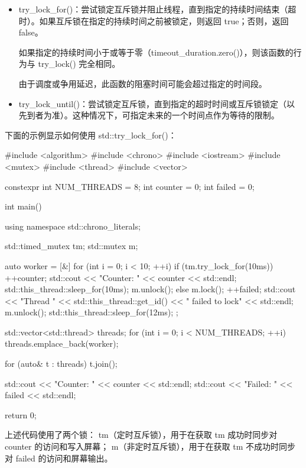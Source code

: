 \begin{itemize}
\item
try\_lock\_for()：尝试锁定互斥锁并阻止线程，直到指定的持续时间结束（超时）。如果互斥锁在指定的持续时间之前被锁定，则返回 true；否则，返回 false。

如果指定的持续时间小于或等于零（timeout\_duration.zero()），则该函数的行为与 try\_lock() 完全相同。

由于调度或争用延迟，此函数的阻塞时间可能会超过指定的时间段。

\item
try\_lock\_until()：尝试锁定互斥锁，直到指定的超时时间或互斥锁锁定（以先到者为准）。这种情况下，可指定未来的一个时间点作为等待的限制。
\end{itemize}

下面的示例显示如何使用 std::try\_lock\_for()：

\begin{cpp}
#include <algorithm>
#include <chrono>
#include <iostream>
#include <mutex>
#include <thread>
#include <vector>

constexpr int NUM_THREADS = 8;
int counter = 0;
int failed = 0;

int main() {
    using namespace std::chrono_literals;

    std::timed_mutex tm;
    std::mutex m;

    auto worker = [&] {
        for (int i = 0; i < 10; ++i) {
            if (tm.try_lock_for(10ms)) {
                ++counter;
                std::cout << "Counter: " << counter << std::endl;
                std::this_thread::sleep_for(10ms);
                m.unlock();
            }
            else {
                m.lock();
                ++failed;
                std::cout << "Thread " << std::this_thread::get_id()
                << " failed to lock" << std::endl;
                m.unlock();
            }
            std::this_thread::sleep_for(12ms);
        }
    };

    std::vector<std::thread> threads;
    for (int i = 0; i < NUM_THREADS; ++i) {
        threads.emplace_back(worker);
    }

    for (auto& t : threads) {
        t.join();
    }

    std::cout << "Counter: " << counter << std::endl;
    std::cout << "Failed: " << failed << std::endl;

    return 0;
}
\end{cpp}

上述代码使用了两个锁： tm（定时互斥锁），用于在获取 tm 成功时同步对 counter 的访问和写入屏幕； m（非定时互斥锁），用于在获取 tm 不成功时同步对 failed 的访问和屏幕输出。

